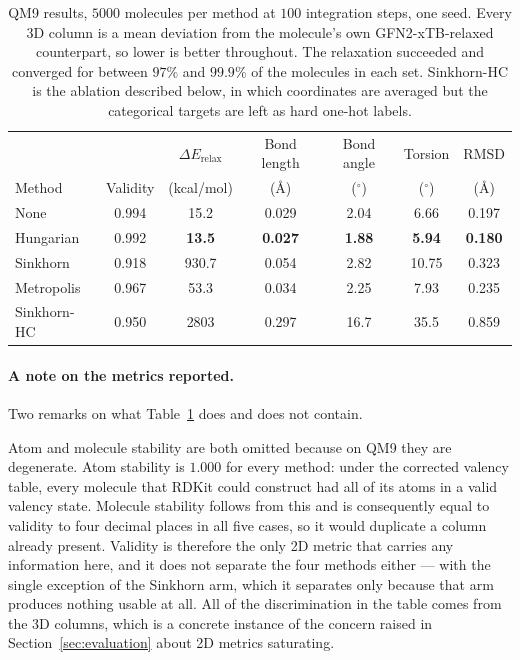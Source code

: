 \begin{table}[h]
\centering
\small
\begin{tabular}{lcccccc}
\hline
 & & $\Delta E_{\text{relax}}$ & Bond length & Bond angle & Torsion & RMSD \\
Method & Validity & (kcal/mol) & (\AA) & ($^\circ$) & ($^\circ$) & (\AA) \\
\hline
None        & 0.994 & 15.2 & 0.029 & 2.04 & 6.66 & 0.197 \\
Hungarian   & 0.992 & \textbf{13.5} & \textbf{0.027} & \textbf{1.88} & \textbf{5.94}
            & \textbf{0.180} \\
Sinkhorn    & 0.918 & 930.7 & 0.054 & 2.82 & 10.75 & 0.323 \\
Metropolis  & 0.967 & 53.3 & 0.034 & 2.25 & 7.93 & 0.235 \\
\hline
Sinkhorn-HC & 0.950 & 2803 & 0.297 & 16.7 & 35.5 & 0.859 \\
\hline
\end{tabular}
\caption{QM9 results, $5000$ molecules per method at $100$ integration steps, one seed. Every 3D
column is a mean deviation from the molecule's own GFN2-xTB-relaxed counterpart, so lower is better
throughout. The relaxation succeeded and converged for between $97\%$ and $99.9\%$ of the molecules
in each set. Sinkhorn-HC is the ablation described below, in which coordinates are averaged but the
categorical targets are left as hard one-hot labels.}
\label{tab:qm9-results}
\end{table}

\paragraph{A note on the metrics reported.}
Two remarks on what Table~\ref{tab:qm9-results} does and does not contain.

Atom and molecule stability are both omitted because on QM9 they are degenerate. Atom stability is
$1.000$ for every method: under the corrected valency table, every molecule that RDKit could
construct had all of its atoms in a valid valency state. Molecule stability follows from this and
is consequently equal to validity to four decimal places in all five cases, so it would duplicate a
column already present. Validity is therefore the only 2D metric that carries any information here,
and it does not separate the four methods either --- with the single exception of the Sinkhorn arm,
which it separates only because that arm produces nothing usable at all. All of the discrimination
in the table comes from the 3D columns, which is a concrete instance of the concern raised in
Section~\ref{sec:evaluation} about 2D metrics saturating.

